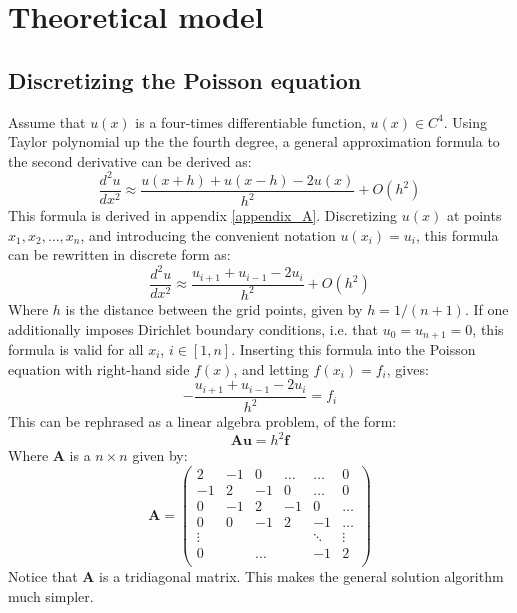\documentclass[a4paper, 10pt]{article}
\begin{document}
\section{Theoretical model}\label{Theoretical_section}
\subsection{Discretizing the Poisson equation}\label{Discretize_Poisson}
Assume that $u(x)$ is a four-times differentiable function, $u(x) \in C^4$. Using Taylor polynomial up the the fourth degree, a general approximation formula to the second derivative can be derived as:
\begin{equation}\label{eq:continuous_derivative}
\frac{d^2 u}{dx^2}\approx \frac{u(x+h)+u(x-h)-2u(x)}{h^2}+O(h^2)
\end{equation}
This formula is derived in appendix \ref{appendix_A}. Discretizing $u(x)$ at points $x_1, x_2, ..., x_n$, and  introducing the convenient notation $u(x_i)=u_i$, this formula can be rewritten in discrete form as:
\begin{equation}\label{eq:discrete_Poisson}
\frac{d^2 u}{dx^2}\approx \frac{u_{i+1}+u_{i-1}-2u_{i}}{h^2}+O(h^2)
\end{equation}
Where $h$ is the distance between the grid points, given by $h=1/(n+1)$. If one additionally imposes Dirichlet boundary conditions, i.e. that $u_0=u_{n+1}=0$, this formula is valid for all $x_i$, $i\in [1, n]$. Inserting this formula into the Poisson equation with right-hand side $f(x)$, and letting $f(x_i)=f_i$, gives:
\begin{equation}\label{Poisson}
-\frac{u_{i+1}+u_{i-1}-2u_{i}}{h^2}=f_i
\end{equation}\label{Poisson}
This can be rephrased as a linear algebra problem, of the form:
$$\mathbf{A}\mathbf{u}=h^2\mathbf{f}$$
Where $\mathbf{A}$ is a $n \times n$ given by:
$$\mathbf{A}=\begin{pmatrix}
2 & -1 & 0 & \ldots &  \ldots & 0\\
-1 & 2 & -1  & 0 & \ldots & 0\\
0 & -1 & 2 &-1 & 0 & \ldots \\
0 & 0 & -1 & 2 &-1 &\ldots\\
\vdots &  & &  &\ddots & \vdots \\
0 && \ldots && -1&  2  \\
\end{pmatrix}$$
Notice that $\mathbf{A}$ is a tridiagonal matrix. This makes the general solution algorithm much simpler.
\end{document}
